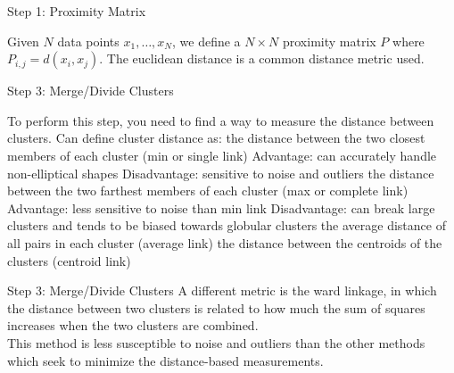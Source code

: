 \documentclass{beamer}
\begin{document}
\begin{frame}{Step 1: Proximity Matrix} 
\begin{outline}
    \1 Given $N$ data points $x_1, \dots, x_N$, we define a $N \times N$ proximity matrix $P$ where $P_{i,j} = d(x_i, x_j)$.
    \2 The euclidean distance is a common distance metric used.
\end{outline}
\end{frame}

\begin{frame}{Step 3: Merge/Divide Clusters}
\begin{outline}
    \1  To perform this step, you need to find a way to measure the distance between clusters. 
    \1 Can define cluster distance as:
    \2 the distance between the two closest members of each cluster (min or single link)
    \3 Advantage: can accurately handle non-elliptical shapes
    \3 Disadvantage: sensitive to noise and outliers
    \2 the distance between the two farthest members of each cluster (max or complete link)
    \3 Advantage: less sensitive to noise than min link
    \3 Disadvantage: can break large clusters and tends to be biased towards globular clusters
    \2 the average distance of all pairs in each cluster (average link)
    \2 the distance between the centroids of the clusters (centroid link)
\end{outline}
\end{frame}

\begin{frame}{Step 3: Merge/Divide Clusters}
    A different metric is the ward linkage, in which the distance between two clusters is related to how much the sum of squares increases when the two clusters are combined. \\ \vspace{0.25 cm}
    This method is less susceptible to noise and outliers than the other methods which seek to minimize the distance-based measurements.
\end{frame}
\end{document}
